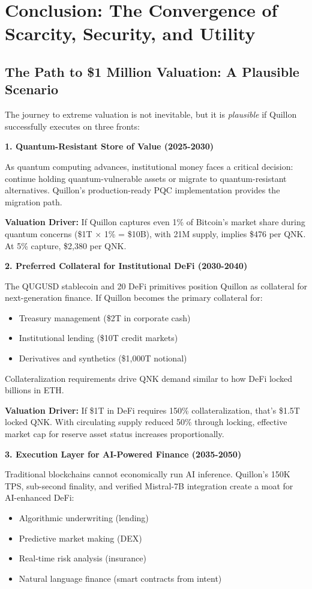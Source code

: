 \documentclass[11pt,a4paper]{article}
\begin{document}
\newpage
\section{Conclusion: The Convergence of Scarcity, Security, and Utility}

\subsection{The Path to \$1 Million Valuation: A Plausible Scenario}

The journey to extreme valuation is not inevitable, but it is \textit{plausible} if Quillon successfully executes on three fronts:

\textbf{1. Quantum-Resistant Store of Value (2025-2030)}

As quantum computing advances, institutional money faces a critical decision: continue holding quantum-vulnerable assets or migrate to quantum-resistant alternatives. Quillon's production-ready PQC implementation provides the migration path.

\textbf{Valuation Driver:} If Quillon captures even 1\% of Bitcoin's market share during quantum concerns (\$1T × 1\% = \$10B), with 21M supply, implies \$476 per QNK. At 5\% capture, \$2,380 per QNK.

\textbf{2. Preferred Collateral for Institutional DeFi (2030-2040)}

The QUGUSD stablecoin and 20 DeFi primitives position Quillon as collateral for next-generation finance. If Quillon becomes the primary collateral for:
\begin{itemize}[leftmargin=*]
\item Treasury management (\$2T in corporate cash)
\item Institutional lending (\$10T credit markets)
\item Derivatives and synthetics (\$1,000T notional)
\end{itemize}

Collateralization requirements drive QNK demand similar to how DeFi locked billions in ETH.

\textbf{Valuation Driver:} If \$1T in DeFi requires 150\% collateralization, that's \$1.5T locked QNK. With circulating supply reduced 50\% through locking, effective market cap for reserve asset status increases proportionally.

\textbf{3. Execution Layer for AI-Powered Finance (2035-2050)}

Traditional blockchains cannot economically run AI inference. Quillon's 150K TPS, sub-second finality, and verified Mistral-7B integration create a moat for AI-enhanced DeFi:
\begin{itemize}[leftmargin=*]
\item Algorithmic underwriting (lending)
\item Predictive market making (DEX)
\item Real-time risk analysis (insurance)
\item Natural language finance (smart contracts from intent)
\end{itemize}
\end{document}
